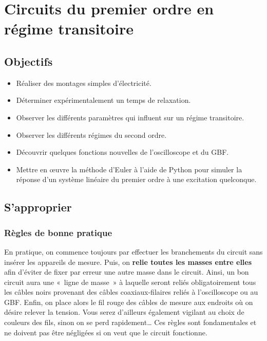 \documentclass[a4paper, 11pt, final, garamond]{book}
\begin{document}
\setcounter{chapter}{6}

\chapter{Circuits du premier ordre en r\'egime transitoire}
\section{Objectifs}

\begin{itemize}
    \item Réaliser des montages simples d'électricité.
    \item Déterminer expérimentalement un temps de relaxation.
    \item Observer les différents paramètres qui influent sur un régime
        transitoire.
    \item Observer les différents régimes du second ordre.
    \item Découvrir quelques fonctions nouvelles de l'oscilloscope et du GBF.
    \item Mettre en œuvre la méthode  d'Euler à l'aide de Python pour simuler la
        réponse d'un système linéaire du premier ordre à une excitation
        quelconque.
\end{itemize}

\section{S'approprier}

\subsection{Règles de bonne pratique}

En pratique, on commence toujours par effectuer les branchements du circuit sans
insérer les appareils de mesure. Puis, on \textbf{relie toutes les masses entre
elles} afin d'éviter de fixer par erreur une autre masse dans le circuit. Ainsi,
un bon circuit aura une «~ligne de masse~» à laquelle seront reliés
obligatoirement tous les câbles noirs provenant des câbles coaxiaux-filaires
reliés à l'oscilloscope ou au GBF. Enfin, on place alors le fil rouge des câbles
de mesure aux endroits où on désire relever la tension. Vous serez d'ailleurs
également vigilant au choix de couleurs des fils, sinon on se perd rapidement…
Ces règles sont fondamentales et ne doivent pas être négligées si on veut que le
circuit fonctionne.
\end{document}
